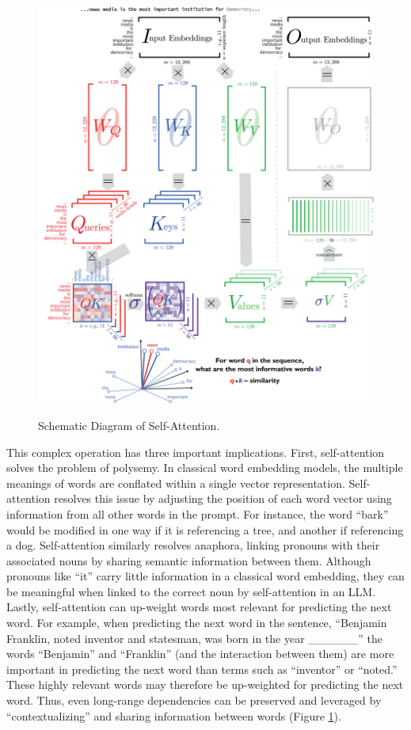 \documentclass{article} %
\begin{document}
\FloatBarrier
\begin{figure}[p]
  \captionsetup{justification=raggedright,singlelinecheck=false}
  \caption{Schematic Diagram of Self-Attention.}
  \centering
  \includegraphics[width=\textwidth, height=\textheight, keepaspectratio]{./figures/media/image18.png}
  \label{fig:schematic1}
\end{figure}
\FloatBarrier

This complex operation has three important implications. First,
self-attention solves the problem of polysemy. In classical word
embedding models, the multiple meanings of words are conflated within a
single vector representation. Self-attention resolves this issue by
adjusting the position of each word vector using information from all
other words in the prompt. For instance, the word ``bark'' would be
modified in one way if it is referencing a tree, and another if
referencing a dog. Self-attention similarly resolves anaphora, linking
pronouns with their associated nouns by sharing semantic information
between them. Although pronouns like ``it'' carry little information in
a classical word embedding, they can be meaningful when linked to the
correct noun by self-attention in an LLM. Lastly, self-attention can
up-weight words most relevant for predicting the next word. For example,
when predicting the next word in the sentence, ``Benjamin Franklin,
noted inventor and statesman, was born in the year \_\_\_\_\_\_'' the
words ``Benjamin'' and ``Franklin'' (and the interaction between them)
are more important in predicting the next word than terms such as
``inventor'' or ``noted.'' These highly relevant words may therefore be
up-weighted for predicting the next word. Thus, even long-range
dependencies can be preserved and leveraged by ``contextualizing'' and
sharing information between words (Figure \ref{fig:schematic1}).
\end{document}
